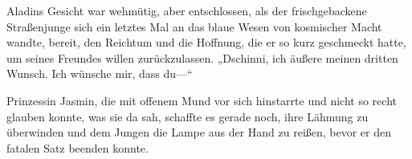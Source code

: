 Aladins Gesicht war wehmütig, aber entschlossen, als der frischgebackene Straßenjunge sich ein letztes Mal an das blaue Wesen von kosmischer Macht wandte, bereit, den Reichtum und die Hoffnung, die er so kurz geschmeckt hatte, um seines Freundes willen zurückzulassen.
„Dschinni, ich äußere meinen dritten Wunsch. Ich wünsche mir, dass du—“

Prinzessin Jasmin, die mit offenem Mund vor sich hinstarrte und nicht so recht glauben konnte, was sie da sah, schaffte es gerade noch, ihre Lähmung zu überwinden und dem Jungen die Lampe aus der Hand zu reißen, bevor er den fatalen Satz beenden konnte.

